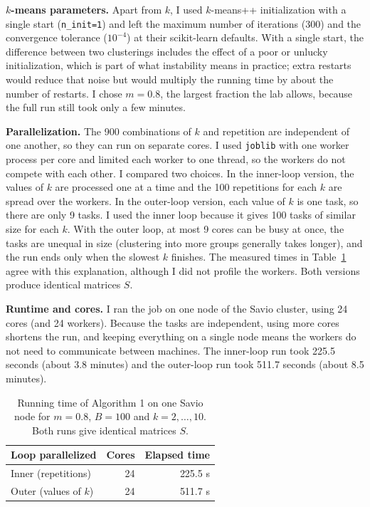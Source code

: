 \documentclass[10pt,letterpaper]{article}
\begin{document}
\textbf{$k$-means parameters.} Apart from $k$, I used $k$-means++ initialization with a single start (\texttt{n\_init=1}) and left the maximum number of iterations (300) and the convergence tolerance ($10^{-4}$) at their scikit-learn defaults. With a single start, the difference between two clusterings includes the effect of a poor or unlucky initialization, which is part of what instability means in practice; extra restarts would reduce that noise but would multiply the running time by about the number of restarts. I chose $m=0.8$, the largest fraction the lab allows, because the full run still took only a few minutes.

\textbf{Parallelization.} The 900 combinations of $k$ and repetition are independent of one another, so they can run on separate cores. I used \texttt{joblib} with one worker process per core and limited each worker to one thread, so the workers do not compete with each other. I compared two choices. In the inner-loop version, the values of $k$ are processed one at a time and the 100 repetitions for each $k$ are spread over the workers. In the outer-loop version, each value of $k$ is one task, so there are only 9 tasks. I used the inner loop because it gives 100 tasks of similar size for each $k$. With the outer loop, at most 9 cores can be busy at once, the tasks are unequal in size (clustering into more groups generally takes longer), and the run ends only when the slowest $k$ finishes. The measured times in Table~\ref{tab:runtime} agree with this explanation, although I did not profile the workers. Both versions produce identical matrices $S$.

\textbf{Runtime and cores.} I ran the job on one node of the Savio cluster, using 24 cores (and 24 workers). Because the tasks are independent, using more cores shortens the run, and keeping everything on a single node means the workers do not need to communicate between machines. The inner-loop run took 225.5 seconds (about 3.8 minutes) and the outer-loop run took 511.7 seconds (about 8.5 minutes).

\begin{table}[ht]
\centering
\begin{tabular}{lrr}
\hline
Loop parallelized & Cores & Elapsed time \\
\hline
Inner (repetitions) & 24 & 225.5 s \\
Outer (values of $k$) & 24 & 511.7 s \\
\hline
\end{tabular}
\caption{Running time of Algorithm 1 on one Savio node for $m=0.8$, $B=100$ and $k=2,\dots,10$. Both runs give identical matrices $S$.}
\label{tab:runtime}
\end{table}
\end{document}
